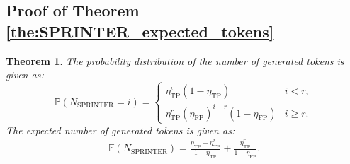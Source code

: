 \documentclass{article}
\theoremstyle{plain}
\newtheorem{theorem}{Theorem}[section]
\theoremstyle{definition}
\theoremstyle{remark}
\begin{document}
\subsection{Proof of Theorem \ref{the:SPRINTER_expected_tokens} }
\label{sec:expec_proof}
\begingroup
\renewcommand{\thetheorem}{\ref{the:SPRINTER_expected_tokens}} %
\begin{theorem}
 The probability distribution of the number of generated tokens is given as: 
    \[
\mathbb{P}(N_\text{SPRINTER}=i) =
\begin{cases}
\eta_\text{TP}^{i} (1-\eta_\text{TP}) & i < r, \\
\eta_\text{TP}^r(\eta_\text{FP})^{i-r}(1-\eta_\text{FP}) & i\geq r.
\end{cases}
\]
The expected number of generated tokens is given as:
    \begin{align}
\label{eq:SPRINT_EXP_TOKEN}
        \mathbb{E}(N_\text{SPRINTER})=       \frac{\eta_\text{TP}-\eta_\text{TP}^r}{1-\eta_\text{TP}} + \frac{\eta_\text{TP}^r}{1-\eta_\text{FP}}.
        \end{align}
\end{theorem}
\endgroup


\end{document}
